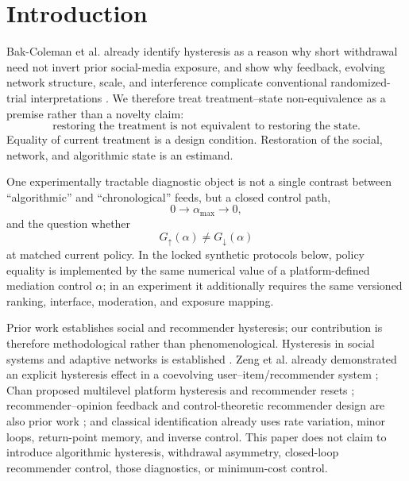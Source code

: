 \documentclass[10pt,a4paper]{article}
\newcommand{\alphamax}{\alpha_{\max}}
\newcommand{\Gup}{G_{\uparrow}}
\newcommand{\Gdown}{G_{\downarrow}}
\begin{document}
\section{Introduction}

Bak-Coleman et al. already identify hysteresis as a reason why short withdrawal need not invert prior social-media exposure, and show why feedback, evolving network structure, scale, and interference complicate conventional randomized-trial interpretations \cite{bakcoleman2025actionable,bakcoleman2025rct}. We therefore treat treatment--state non-equivalence as a premise rather than a novelty claim:
\begin{equation}
\boxed{\text{restoring the treatment is not equivalent to restoring the state}.}
\label{eq:principle}
\end{equation}
Equality of current treatment is a design condition. Restoration of the social, network, and algorithmic state is an estimand.

One experimentally tractable diagnostic object is not a single contrast between ``algorithmic'' and ``chronological'' feeds, but a closed control path,
\begin{equation}
0\longrightarrow\alphamax\longrightarrow0,
\end{equation}
and the question whether
\begin{equation}
\Gup(\alpha)\neq\Gdown(\alpha)
\end{equation}
at matched current policy. In the locked synthetic protocols below, policy equality is implemented by the same numerical value of a platform-defined mediation control $\alpha$; in an experiment it additionally requires the same versioned ranking, interface, moderation, and exposure mapping.

Prior work establishes social and recommender hysteresis; our contribution is therefore methodological rather than phenomenological. Hysteresis in social systems and adaptive networks is established \cite{sznajdweron2024toward,oestereich2020hysteresis,nowak2020threshold,macy2021polarization,su2017contagion,chen2019vaccine,graham2020sociology,maia2021adaptive,asikainen2020cumulative}. Zeng et al. already demonstrated an explicit hysteresis effect in a coevolving user--item/recommender system \cite{zeng2015mutual}; Chan proposed multilevel platform hysteresis and recommender resets \cite{chan2026brake}; recommender--opinion feedback and control-theoretic recommender design are also prior work \cite{davidson2026closedloop,depasquale2026control,mariano2026optimal,mariano2026pathological}; and classical identification already uses rate variation, minor loops, return-point memory, and inverse control. This paper does not claim to introduce algorithmic hysteresis, withdrawal asymmetry, closed-loop recommender control, those diagnostics, or minimum-cost control.
\end{document}
